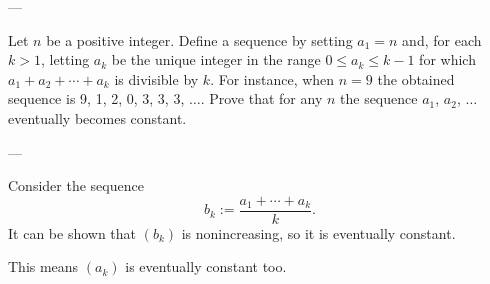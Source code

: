 
---

Let $n$ be a positive integer. Define a sequence by setting $a_1=n$ and, for each $k>1$, letting $a_k$ be the unique integer in the range $0\leq a_k\leq k-1$ for which $a_1+a_2+\cdots+a_k$ is divisible by $k$. For instance, when $n=9$ the obtained sequence is 9, 1, 2, 0, 3, 3, 3, $\ldots$. Prove that for any $n$ the sequence $a_1$, $a_2$, $\ldots$ eventually becomes constant.

---

Consider the sequence
\[b_k:=\frac{a_1+\cdots+a_k}k.\]
It can be shown that $(b_k)$ is nonincreasing, so it is eventually constant.

This means $(a_k)$ is eventually constant too.

